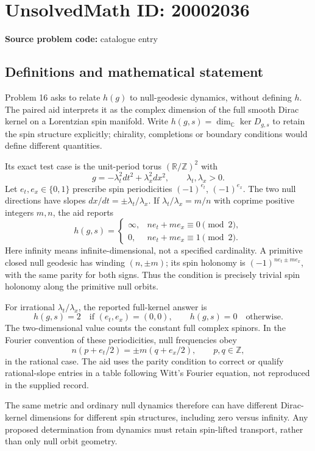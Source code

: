 \documentclass[11pt]{article}
\begin{document}
\section*{UnsolvedMath ID: 20002036}
\textbf{Source problem code:} catalogue entry
\subsection{Definitions and mathematical statement}
Problem 16 asks to relate \(h(g)\) to null-geodesic dynamics, without defining \(h\). The paired aid interprets it as the complex dimension of the full smooth Dirac kernel on a Lorentzian spin manifold. Write \(h(g,s)=\dim_{\mathbb C}\ker D_{g,s}\) to retain the spin structure explicitly; chirality, completions or boundary conditions would define different quantities.

Its exact test case is the unit-period torus \((\mathbb R/\mathbb Z)^2\) with
\[
 g=-\lambda_t^2dt^2+\lambda_x^2dx^2,\qquad
 \lambda_t,\lambda_x>0.
\]
Let \(e_t,e_x\in\{0,1\}\) prescribe spin periodicities \((-1)^{e_t}\), \((-1)^{e_x}\). The two null directions have slopes \(dx/dt=\pm\lambda_t/\lambda_x\). If
\(\lambda_t/\lambda_x=m/n\) with coprime positive integers \(m,n\), the aid reports
\[
 h(g,s)=\begin{cases}
 \infty,&ne_t+me_x\equiv0\pmod2,\\
 0,&ne_t+me_x\equiv1\pmod2.
 \end{cases}
\]
Here infinity means infinite-dimensional, not a specified cardinality. A primitive closed null geodesic has winding \((n,\pm m)\); its spin holonomy is
\( (-1)^{ne_t\pm me_x}\), with the same parity for both signs. Thus the condition is precisely trivial spin holonomy along the primitive null orbits.

For irrational \(\lambda_t/\lambda_x\), the reported full-kernel answer is
\[
 h(g,s)=2\quad\text{if }(e_t,e_x)=(0,0),\qquad
 h(g,s)=0\quad\text{otherwise}.
\]
The two-dimensional value counts the constant full complex spinors. In the Fourier convention of these periodicities, null frequencies obey
\[
 n(p+e_t/2)=\pm m(q+e_x/2),\qquad p,q\in\mathbb Z,
\]
in the rational case. The aid uses the parity condition to correct or qualify rational-slope entries in a table following Witt's Fourier equation, not reproduced in the supplied record.

The same metric and ordinary null dynamics therefore can have different Dirac-kernel dimensions for different spin structures, including zero versus infinity. Any proposed determination from dynamics must retain spin-lifted transport, rather than only null orbit geometry.
\end{document}
